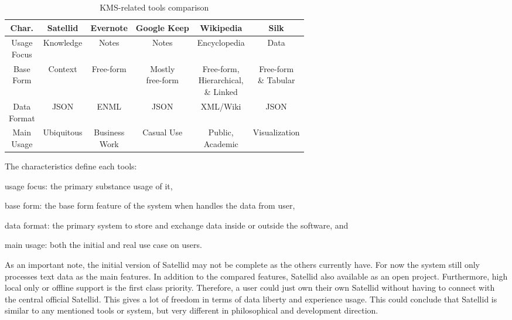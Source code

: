\begin{table}[h!]
\centering
\caption{KMS-related tools comparison}
\label{table:kms-comparison}
\begin{tabular}{ |c||c|c|c|c|c| }
\hline
Char.  & Satellid   & Evernote      & Google Keep & Wikipedia    & Silk \\ \hline
\hline
\shortstack{Usage\\Focus} & Knowledge  & Notes         & Notes       & Encyclopedia & Data \\ \hline
\shortstack{Base\\Form}   & Context    & Free-form     & \shortstack{Mostly\\free-form} & \shortstack{Free-form,\\Hierarchical,\\\& Linked} & \shortstack{Free-form\\\& Tabular} \\ \hline
\shortstack{Data\\Format} & JSON       & ENML          & JSON        & XML/Wiki     & JSON \\ \hline
\shortstack{Main\\Usage} & Ubiquitous & \shortstack{Business\\Work} & Casual Use  & \shortstack{Public,\\Academic} & Visualization \\
\hline
\end{tabular}
\end{table}

The characteristics define each tools:
\begin{inparaenum}[\itshape 1\upshape)]
\item usage focus: the primary substance usage of it,
\item base form: the base form feature of the system when handles the data from user,
\item data format: the primary system to store and exchange data inside or outside the software, and
\item main usage: both the initial and real use case on users.
\end{inparaenum}
As an important note, the initial version of Satellid may not be complete as the others currently have.
For now the system still only processes text data as the main features.
In addition to the compared features, Satellid also available as an open project.
Furthermore, high local only or offline support is the first class priority.
Therefore, a user could just own their own Satellid without having to connect with the central official Satellid.
This gives a lot of freedom in terms of data liberty and experience usage.
This could conclude that Satellid is similar to any mentioned tools or system, but very different in philosophical and development direction.
